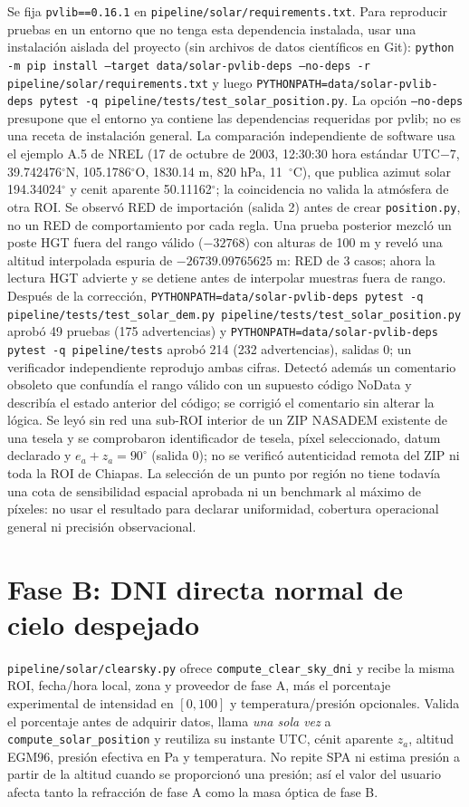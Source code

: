 \documentclass[11pt,a4paper]{article}
\begin{document}
Se fija \texttt{pvlib==0.16.1} en \texttt{pipeline/solar/requirements.txt}. Para reproducir pruebas en un entorno que no tenga esta dependencia instalada, usar una instalación aislada del proyecto (sin archivos de datos científicos en Git): \texttt{python -m pip install --target data/solar-pvlib-deps --no-deps -r pipeline/solar/requirements.txt} y luego \texttt{PYTHONPATH=data/solar-pvlib-deps pytest -q pipeline/tests/test\_solar\_position.py}. La opción \texttt{--no-deps} presupone que el entorno ya contiene las dependencias requeridas por pvlib; no es una receta de instalación general. La comparación independiente de software usa el ejemplo A.5 de NREL (17 de octubre de 2003, 12:30:30 hora estándar UTC$-7$, 39.742476$^\circ$N, 105.1786$^\circ$O, 1830.14 m, 820 hPa, 11~$^\circ$C), que publica azimut solar 194.34024$^\circ$ y cenit aparente 50.11162$^\circ$; la coincidencia no valida la atmósfera de otra ROI. Se observó RED de importación (salida 2) antes de crear \texttt{position.py}, no un RED de comportamiento por cada regla. Una prueba posterior mezcló un poste HGT fuera del rango válido ($-32768$) con alturas de 100 m y reveló una altitud interpolada espuria de $-26739.09765625$ m: RED de 3 casos; ahora la lectura HGT advierte y se detiene antes de interpolar muestras fuera de rango. Después de la corrección, \texttt{PYTHONPATH=data/solar-pvlib-deps pytest -q pipeline/tests/test\_solar\_dem.py pipeline/tests/test\_solar\_position.py} aprobó 49 pruebas (175 advertencias) y \texttt{PYTHONPATH=data/solar-pvlib-deps pytest -q pipeline/tests} aprobó 214 (232 advertencias), salidas 0; un verificador independiente reprodujo ambas cifras. Detectó además un comentario obsoleto que confundía el rango válido con un supuesto código NoData y describía el estado anterior del código; se corrigió el comentario sin alterar la lógica. Se leyó sin red una sub-ROI interior de un ZIP NASADEM existente de una tesela y se comprobaron identificador de tesela, píxel seleccionado, datum declarado y $e_a+z_a=90^\circ$ (salida 0); no se verificó autenticidad remota del ZIP ni toda la ROI de Chiapas. La selección de un punto por región no tiene todavía una cota de sensibilidad espacial aprobada ni un benchmark al máximo de píxeles: no usar el resultado para declarar uniformidad, cobertura operacional general ni precisión observacional.

\section{Fase B: DNI directa normal de cielo despejado}
\texttt{pipeline/solar/clearsky.py} ofrece \texttt{compute\_clear\_sky\_dni} y recibe la misma ROI, fecha/hora local, zona y proveedor de fase A, más el porcentaje experimental de intensidad en $[0,100]$ y temperatura/presión opcionales. Valida el porcentaje antes de adquirir datos, llama \emph{una sola vez} a \texttt{compute\_solar\_position} y reutiliza su instante UTC, cénit aparente $z_a$, altitud EGM96, presión efectiva en Pa y temperatura. No repite SPA ni estima presión a partir de la altitud cuando se proporcionó una presión; así el valor del usuario afecta tanto la refracción de fase A como la masa óptica de fase B.
\end{document}
